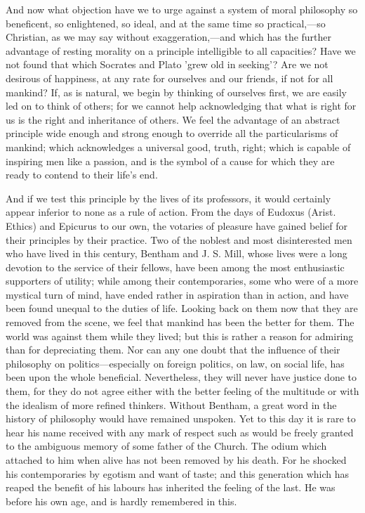 \documentclass[11pt,letter]{article}
\begin{document}
\par  And now what objection have we to urge against a system of moral philosophy so beneficent, so enlightened, so ideal, and at the same time so practical,—so Christian, as we may say without exaggeration,—and which has the further advantage of resting morality on a principle intelligible to all capacities? Have we not found that which Socrates and Plato 'grew old in seeking'? Are we not desirous of happiness, at any rate for ourselves and our friends, if not for all mankind? If, as is natural, we begin by thinking of ourselves first, we are easily led on to think of others; for we cannot help acknowledging that what is right for us is the right and inheritance of others. We feel the advantage of an abstract principle wide enough and strong enough to override all the particularisms of mankind; which acknowledges a universal good, truth, right; which is capable of inspiring men like a passion, and is the symbol of a cause for which they are ready to contend to their life's end.

\par  And if we test this principle by the lives of its professors, it would certainly appear inferior to none as a rule of action. From the days of Eudoxus (Arist. Ethics) and Epicurus to our own, the votaries of pleasure have gained belief for their principles by their practice. Two of the noblest and most disinterested men who have lived in this century, Bentham and J. S. Mill, whose lives were a long devotion to the service of their fellows, have been among the most enthusiastic supporters of utility; while among their contemporaries, some who were of a more mystical turn of mind, have ended rather in aspiration than in action, and have been found unequal to the duties of life. Looking back on them now that they are removed from the scene, we feel that mankind has been the better for them. The world was against them while they lived; but this is rather a reason for admiring than for depreciating them. Nor can any one doubt that the influence of their philosophy on politics—especially on foreign politics, on law, on social life, has been upon the whole beneficial. Nevertheless, they will never have justice done to them, for they do not agree either with the better feeling of the multitude or with the idealism of more refined thinkers. Without Bentham, a great word in the history of philosophy would have remained unspoken. Yet to this day it is rare to hear his name received with any mark of respect such as would be freely granted to the ambiguous memory of some father of the Church. The odium which attached to him when alive has not been removed by his death. For he shocked his contemporaries by egotism and want of taste; and this generation which has reaped the benefit of his labours has inherited the feeling of the last. He was before his own age, and is hardly remembered in this.
\end{document}
